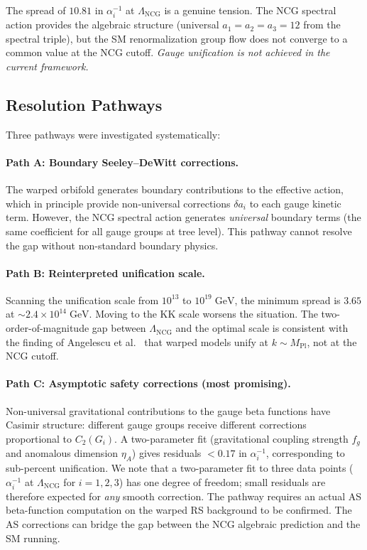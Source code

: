 The spread of $10.81$ in $\alpha_i^{-1}$ at $\Lambda_{\mathrm{NCG}}$ is a genuine tension.  The NCG spectral action provides the algebraic structure (universal $a_1 = a_2 = a_3 = 12$ from the spectral triple), but the SM renormalization group flow does not converge to a common value at the NCG cutoff.  \emph{Gauge unification is not achieved in the current framework.}

\subsection{Resolution Pathways}
\label{sec:4-unification-pathways}

Three pathways were investigated systematically:

\paragraph{Path A: Boundary Seeley--DeWitt corrections.}
The warped orbifold generates boundary contributions to the effective action, which in principle provide non-universal corrections $\delta a_i$ to each gauge kinetic term.  However, the NCG spectral action generates \emph{universal} boundary terms (the same coefficient for all gauge groups at tree level).  This pathway cannot resolve the gap without non-standard boundary physics.

\paragraph{Path B: Reinterpreted unification scale.}
Scanning the unification scale from $10^{13}$ to $10^{19}\;\mathrm{GeV}$, the minimum spread is $3.65$ at $\sim 2.4 \times 10^{14}\;\mathrm{GeV}$.  Moving to the KK scale worsens the situation.  The two-order-of-magnitude gap between $\Lambda_{\mathrm{NCG}}$ and the optimal scale is consistent with the finding of Angelescu et al.~\cite{ch4:Angelescu2024} that warped models unify at $k \sim M_{\mathrm{Pl}}$, not at the NCG cutoff.

\paragraph{Path C: Asymptotic safety corrections (most promising).}
Non-universal gravitational contributions to the gauge beta functions have Casimir structure: different gauge groups receive different corrections proportional to $C_2(G_i)$.  A two-parameter fit (gravitational coupling strength $f_g$ and anomalous dimension $\eta_A$) gives residuals $< 0.17$ in $\alpha_i^{-1}$, corresponding to sub-percent unification.  We note that a two-parameter fit to three data points ($\alpha_i^{-1}$ at $\Lambda_\mathrm{NCG}$ for $i = 1,2,3$) has one degree of freedom; small residuals are therefore expected for \emph{any} smooth correction. The pathway requires an actual AS beta-function computation on the warped RS background to be confirmed.  The AS corrections can bridge the gap between the NCG algebraic prediction and the SM running.

